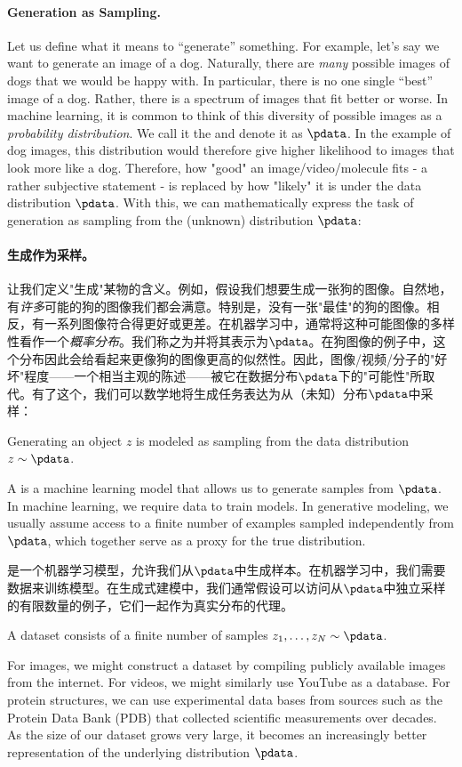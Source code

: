 \paragraph{Generation as Sampling.}Let us define what it means to ``generate'' something. For example, let's say we want to generate an image of a dog. Naturally, there are \emph{many} possible images of dogs that we would be happy with. In particular, there is no one single ``best'' image of a dog. Rather, there is a spectrum of images that fit better or worse. In machine learning, it is common to think of this diversity of possible images as a \emph{probability distribution}. We call it the  and denote it as $\pdata$. In the example of dog images, this distribution would therefore give higher likelihood to images that look more like a dog. Therefore, how "good" an image/video/molecule fits - a rather subjective statement - is replaced by how "likely" it is under the data distribution $\pdata$. With this, we can mathematically express the task of generation as sampling from the (unknown) distribution $\pdata$:

\paragraph{生成作为采样。}让我们定义"生成"某物的含义。例如，假设我们想要生成一张狗的图像。自然地，有\emph{许多}可能的狗的图像我们都会满意。特别是，没有一张"最佳"的狗的图像。相反，有一系列图像符合得更好或更差。在机器学习中，通常将这种可能图像的多样性看作一个\emph{概率分布}。我们称之为并将其表示为$\pdata$。在狗图像的例子中，这个分布因此会给看起来更像狗的图像更高的似然性。因此，图像/视频/分子的"好坏"程度——一个相当主观的陈述——被它在数据分布$\pdata$下的"可能性"所取代。有了这个，我们可以数学地将生成任务表达为从（未知）分布$\pdata$中采样：
\begin{ideabox}
    Generating an object $z$ is modeled as sampling from the data distribution $z\sim \pdata$.
\end{ideabox}
A  is a machine learning model that allows us to generate samples from $\pdata$. In machine learning, we require data to train models. In generative modeling, we usually assume access to a finite number of examples sampled independently from $\pdata$, which together serve as a proxy for the true distribution.

是一个机器学习模型，允许我们从$\pdata$中生成样本。在机器学习中，我们需要数据来训练模型。在生成式建模中，我们通常假设可以访问从$\pdata$中独立采样的有限数量的例子，它们一起作为真实分布的代理。
\begin{ideabox}[Dataset]
    A dataset consists of a finite number of samples $z_1, \dots, z_N \sim \pdata$.
\end{ideabox}
For images, we might construct a dataset by compiling publicly available images from the internet. For videos, we might similarly use YouTube as a database. For protein structures, we can use experimental data bases from sources such as the Protein Data Bank (PDB) that collected scientific measurements over decades. As the size of our dataset grows very large, it becomes an increasingly better representation of the underlying distribution $\pdata$.

